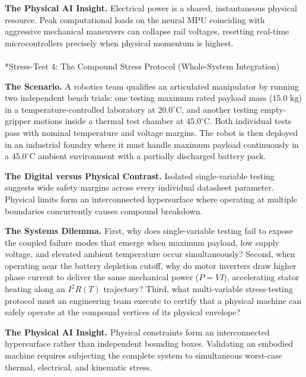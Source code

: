 \documentclass[
  letterpaper,
  DIV=11,
  numbers=noendperiod]{scrartcl}
\makeatletter
\let\oldparagraph\paragraph
\renewcommand{\paragraph}{
    \@ifstar
      \xxxParagraphStar
      \xxxParagraphNoStar
  }
\newcommand{\xxxParagraphStar}[1]{\oldparagraph*{#1}\mbox{}}
\newcommand{\xxxParagraphNoStar}[1]{\oldparagraph{#1}\mbox{}}
\makeatother
\begin{document}
\textbf{The Physical AI Insight.} Electrical power is a shared,
instantaneous physical resource. Peak computational loads on the neural
MPU coinciding with aggressive mechanical maneuvers can collapse rail
voltages, resetting real-time microcontrollers precisely when physical
momentum is highest.

\paragraph*{Stress-Test 4: The Compound Stress Protocol (Whole-System
Integration)}\label{stress-test-4-the-compound-stress-protocol-whole-system-integration}

\textbf{The Scenario.} A robotics team qualifies an articulated
manipulator by running two independent bench trials: one testing maximum
rated payload mass (\(15.0\text{ kg}\)) in a temperature-controlled
laboratory at \(20.0^{\circ}\text{C}\), and another testing
empty-gripper motions inside a thermal test chamber at
\(45.0^{\circ}\text{C}\). Both individual tests pass with nominal
temperature and voltage margins. The robot is then deployed in an
industrial foundry where it must handle maximum payload continuously in
a \(45.0^{\circ}\text{C}\) ambient environment with a partially
discharged battery pack.

\textbf{The Digital versus Physical Contrast.} Isolated single-variable
testing suggests wide safety margins across every individual datasheet
parameter. Physical limits form an interconnected hypersurface where
operating at multiple boundaries concurrently causes compound breakdown.

\textbf{The Systems Dilemma.} First, why does single-variable testing
fail to expose the coupled failure modes that emerge when maximum
payload, low supply voltage, and elevated ambient temperature occur
simultaneously? Second, when operating near the battery depletion
cutoff, why do motor inverters draw higher phase current to deliver the
same mechanical power (\(P = V I\)), accelerating stator heating along
an \(I^2 R(T)\) trajectory? Third, what multi-variable stress-testing
protocol must an engineering team execute to certify that a physical
machine can safely operate at the compound vertices of its physical
envelope?

\textbf{The Physical AI Insight.} Physical constraints form an
interconnected hypersurface rather than independent bounding boxes.
Validating an embodied machine requires subjecting the complete system
to simultaneous worst-case thermal, electrical, and kinematic stress.
\end{document}
